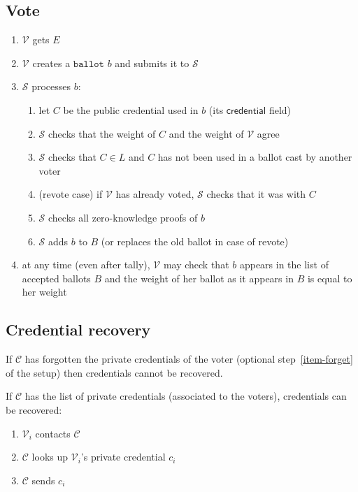\documentclass[a4paper]{article}
\newcommand{\ballot}{\texttt{ballot}}
\begin{document}
\subsection{Vote}

\begin{enumerate}
\item $\mathcal{V}$ gets $E$
\item $\mathcal{V}$ creates a \hyperref[ballots]{$\ballot$} $b$ and submits it to $\mathcal{S}$
\item $\mathcal{S}$ processes $b$:
  \begin{enumerate}
  \item let $C$ be the public credential used in $b$ (its
    $\textsf{credential}$ field)
  \item $\mathcal{S}$ checks that the weight of $C$ and the weight of
    $\mathcal{V}$ agree
  \item $\mathcal{S}$ checks that $C\in L$ and $C$ has not been used
    in a ballot cast by another voter
  \item (revote case) if $\mathcal{V}$ has already voted,
    $\mathcal{S}$ checks that it was with $C$
  \item $\mathcal{S}$ checks all zero-knowledge proofs of $b$
  \item $\mathcal{S}$ adds $b$ to $B$ (or replaces the old ballot in
    case of revote)
  \end{enumerate}
\item at any time (even after tally), $\mathcal{V}$ may check that $b$
  appears in the list of accepted ballots $B$ and the weight of her
  ballot as it appears in $B$ is equal to her weight
\end{enumerate}


\subsection{Credential recovery}

If $\mathcal C$ has forgotten the private credentials of the voter
(optional step~\ref{item-forget} of the setup) then credentials cannot
be recovered.

If $\mathcal C$ has the list of private credentials (associated to the
voters), credentials can be recovered:
\begin{enumerate}
\item $\mathcal{V}_i$ contacts $\mathcal{C}$
\item $\mathcal{C}$ looks up $\mathcal{V}_i$'s private credential $c_i$
\item $\mathcal{C}$ sends $c_i$
\end{enumerate}
\end{document}
